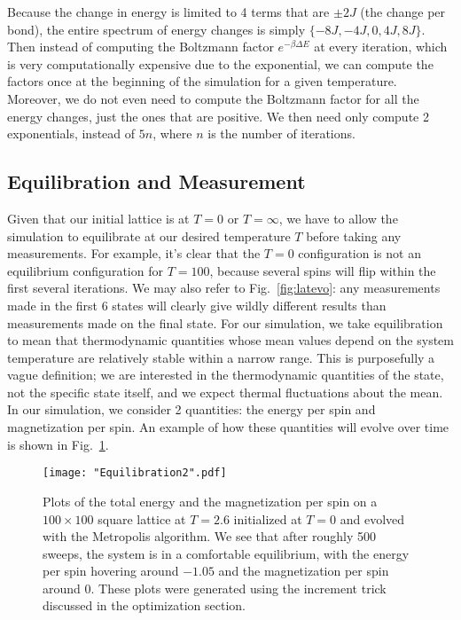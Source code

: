 \documentclass[twocolumn,aps]{revtex4-1} %
\begin{document}
Because the change in energy is limited to 4 terms that are $\pm 2J$ (the change per bond), the entire spectrum of energy changes is simply $\{-8J, -4J, 0, 4J, 8J\}$. Then instead of computing the Boltzmann factor $e^{-\beta\Delta E}$ at every iteration, which is very computationally expensive due to the exponential, we can compute the factors once at the beginning of the simulation for a given temperature. Moreover, we do not even need to compute the Boltzmann factor for all the energy changes, just the ones that are positive. We then need only compute 2 exponentials, instead of $5n$, where $n$ is the number of iterations.

\subsection{Equilibration and Measurement}
Given that our initial lattice is at $T = 0$ or $T = \infty$, we have to allow the simulation to equilibrate at our desired temperature $T$ before taking any measurements. For example, it's clear that the $T = 0$ configuration is not an equilibrium configuration for $T = 100$, because several spins will flip within the first several iterations. We may also refer to Fig.~\ref{fig:latevo}: any measurements made in the first 6 states will clearly give wildly different results than measurements made on the final state. For our simulation, we take equilibration to mean that thermodynamic quantities whose mean values depend on the system temperature are relatively stable within a narrow range. This is purposefully a vague definition; we are interested in the thermodynamic quantities of the state, not the specific state itself, and we expect thermal fluctuations about the mean. In our simulation, we consider 2 quantities: the energy per spin and magnetization per spin. An example of how these quantities will evolve over time is shown in Fig.~\ref{fig:equil}. 
\begin{figure}
	\texttt{[image: "Equilibration2".pdf]}
	\caption{\label{fig:equil}Plots of the total energy and the magnetization per spin on a $100 \times 100$ square lattice at $T = 2.6$ initialized at $T = 0$ and evolved with the Metropolis algorithm. We see that after roughly 500 sweeps, the system is in a comfortable equilibrium, with the energy per spin hovering around $-1.05$ and the magnetization per spin around $0$. These plots were generated using the increment trick discussed in the optimization section.}
\end{figure}
\end{document}
